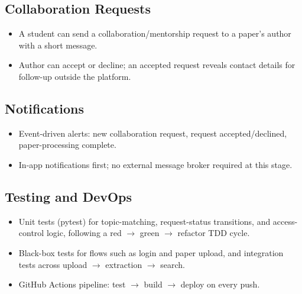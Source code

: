 \documentclass[11pt]{article}
\begin{document}
\subsection{Collaboration Requests}
\begin{itemize}[itemsep=2pt]
    \item A student can send a collaboration/mentorship request to a paper's author with a short message.
    \item Author can accept or decline; an accepted request reveals contact details for follow-up outside the platform.
\end{itemize}

\subsection{Notifications}
\begin{itemize}[itemsep=2pt]
    \item Event-driven alerts: new collaboration request, request accepted/declined, paper-processing complete.
    \item In-app notifications first; no external message broker required at this stage.
\end{itemize}

\subsection{Testing and DevOps}
\begin{itemize}[itemsep=2pt]
    \item Unit tests (pytest) for topic-matching, request-status transitions, and access-control logic, following a red $\rightarrow$ green $\rightarrow$ refactor TDD cycle.
    \item Black-box tests for flows such as login and paper upload, and integration tests across upload $\rightarrow$ extraction $\rightarrow$ search.
    \item GitHub Actions pipeline: test $\rightarrow$ build $\rightarrow$ deploy on every push.
\end{itemize}
\end{document}
